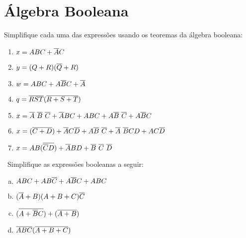 
\section*{Álgebra Booleana}

\exercise Simplifique cada uma das expressões usando os
teoremas da álgebra booleana:

\begin{enumerate}
\item $x=ABC+\overline{A}C$
\item $y=(Q+R)(\overline{Q}+R)$
\item $w=ABC+A\overline{B}C+\overline{A}$
\item $q=\overline{RST}(\overline{R+S+T})$
\item $x=\NOT{A}\ \NOT{B}\ \NOT{C}+\NOT{A}BC+ABC+A\NOT{B}\ \NOT{C}+A\NOT{B}C$
\item $x=(\NOT{C+D})+\NOT{A}C\NOT{D}+A\NOT{B}\ \NOT{C}+\NOT{A}\ \NOT{B}CD+AC\NOT{D}$
\item $x=AB(\NOT{\NOT{C}D})+\NOT{A}BD+\NOT{B}\ \NOT{C}\ \NOT{D}$
\end{enumerate}

\exercise~Simplifique as expressões booleanas a seguir:

\begin{enumerate}[(a)]
\item $ABC+AB\overline{C}+A\overline{B}C+ABC$



\item $(\overline{A}+B)(A+B+C)\overline{C}$




\item $(\overline{A+\overline{B}C})+(\overline{A+B})$

\item $\overline{ABC}(\overline{A+B+C})$

\end{enumerate}

